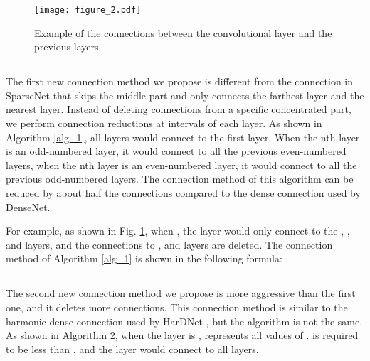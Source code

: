 \documentclass[conference]{IEEEtran}
\begin{document}
\begin{figure}[htbp]
\centerline{\texttt{[image: figure\_2.pdf]}}
\caption{Example of the connections between the  convolutional layer and the previous layers.}
\label{fig2}
\end{figure}

\begin{algorithm}
\caption{}
\label{alg_1}
\begin{algorithmic}
\ENSURE {}
\ENDFOR
\ENDFOR
{}
\ENDFOR
\ENDFOR
\end{algorithmic}
\end{algorithm}

\subsection{}
The first new connection method we propose is different from the connection in SparseNet \cite{liu2018sparsenet} that skips the middle part and only connects the farthest layer and the nearest layer. Instead of deleting connections from a specific concentrated part, we perform connection reductions at intervals of each layer. As shown in Algorithm \ref{alg_1}, all layers would connect to the first layer. When the nth layer is an odd-numbered layer, it would connect to all the previous even-numbered layers, when the nth layer is an even-numbered layer, it would connect to all the previous odd-numbered layers. The connection method of this algorithm can be reduced by about half the connections compared to the dense connection used by DenseNet.

For example, as shown in Fig. \ref{fig2}, when , the  layer would only connect to the , ,  and  layers, and the connections to ,  and  layers are deleted. The connection method of Algorithm \ref{alg_1} is shown in the following formula:



\subsection{}
The second new connection method we propose is more aggressive than the first one, and it deletes more connections. This connection method is similar to the harmonic dense connection used by HarDNet \cite{chao2019hardnet}, but the algorithm is not the same. As shown in Algorithm 2, when the layer is ,  represents all values of .  is required to be less than , and the  layer would connect to all  layers.
\end{document}
